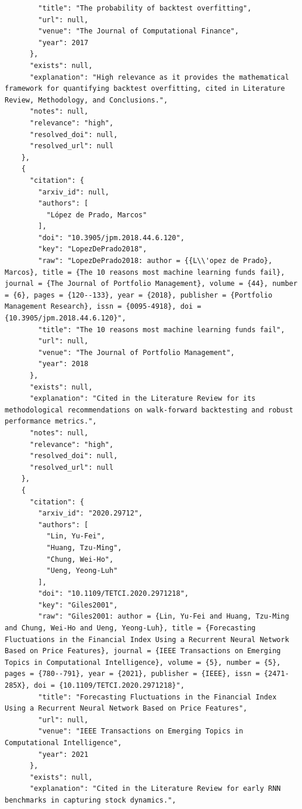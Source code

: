 \documentclass[11pt]{article}
\begin{document}
\begin{verbatim}
        "title": "The probability of backtest overfitting",
        "url": null,
        "venue": "The Journal of Computational Finance",
        "year": 2017
      },
      "exists": null,
      "explanation": "High relevance as it provides the mathematical framework for quantifying backtest overfitting, cited in Literature Review, Methodology, and Conclusions.",
      "notes": null,
      "relevance": "high",
      "resolved_doi": null,
      "resolved_url": null
    },
    {
      "citation": {
        "arxiv_id": null,
        "authors": [
          "López de Prado, Marcos"
        ],
        "doi": "10.3905/jpm.2018.44.6.120",
        "key": "LopezDePrado2018",
        "raw": "LopezDePrado2018: author = {{L\\'opez de Prado}, Marcos}, title = {The 10 reasons most machine learning funds fail}, journal = {The Journal of Portfolio Management}, volume = {44}, number = {6}, pages = {120--133}, year = {2018}, publisher = {Portfolio Management Research}, issn = {0095-4918}, doi = {10.3905/jpm.2018.44.6.120}",
        "title": "The 10 reasons most machine learning funds fail",
        "url": null,
        "venue": "The Journal of Portfolio Management",
        "year": 2018
      },
      "exists": null,
      "explanation": "Cited in the Literature Review for its methodological recommendations on walk-forward backtesting and robust performance metrics.",
      "notes": null,
      "relevance": "high",
      "resolved_doi": null,
      "resolved_url": null
    },
    {
      "citation": {
        "arxiv_id": "2020.29712",
        "authors": [
          "Lin, Yu-Fei",
          "Huang, Tzu-Ming",
          "Chung, Wei-Ho",
          "Ueng, Yeong-Luh"
        ],
        "doi": "10.1109/TETCI.2020.2971218",
        "key": "Giles2001",
        "raw": "Giles2001: author = {Lin, Yu-Fei and Huang, Tzu-Ming and Chung, Wei-Ho and Ueng, Yeong-Luh}, title = {Forecasting Fluctuations in the Financial Index Using a Recurrent Neural Network Based on Price Features}, journal = {IEEE Transactions on Emerging Topics in Computational Intelligence}, volume = {5}, number = {5}, pages = {780--791}, year = {2021}, publisher = {IEEE}, issn = {2471-285X}, doi = {10.1109/TETCI.2020.2971218}",
        "title": "Forecasting Fluctuations in the Financial Index Using a Recurrent Neural Network Based on Price Features",
        "url": null,
        "venue": "IEEE Transactions on Emerging Topics in Computational Intelligence",
        "year": 2021
      },
      "exists": null,
      "explanation": "Cited in the Literature Review for early RNN benchmarks in capturing stock dynamics.",

\end{verbatim}
\end{document}
